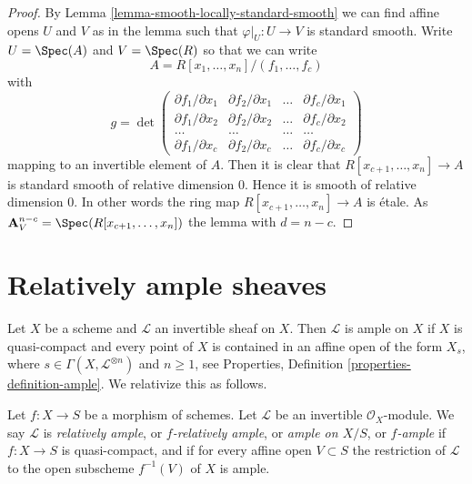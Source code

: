 \begin{proof}
By
Lemma \ref{lemma-smooth-locally-standard-smooth}
we can find affine opens $U$ and $V$ as in the lemma such that
$\varphi|_U : U \to V$ is standard smooth. Write
$U = \Spec(A)$ and $V = \Spec(R)$ so that we can write
$$
A = R[x_1, \ldots, x_n]/(f_1, \ldots, f_c)
$$
with
$$
g =
\det
\left(
\begin{matrix}
\partial f_1/\partial x_1 &
\partial f_2/\partial x_1 &
\ldots &
\partial f_c/\partial x_1 \\
\partial f_1/\partial x_2 &
\partial f_2/\partial x_2 &
\ldots &
\partial f_c/\partial x_2 \\
\ldots & \ldots & \ldots & \ldots \\
\partial f_1/\partial x_c &
\partial f_2/\partial x_c &
\ldots &
\partial f_c/\partial x_c
\end{matrix}
\right)
$$
mapping to an invertible element of $A$. Then it is clear that
$R[x_{c + 1}, \ldots, x_n] \to A$ is standard smooth of relative
dimension $0$. Hence it is smooth of relative dimension $0$.
In other words the ring map $R[x_{c + 1}, \ldots, x_n] \to A$
is \'etale. As $\mathbf{A}^{n - c}_V = \Spec(R[x_{c + 1}, \ldots, x_n])$
the lemma with $d = n - c$.
\end{proof}
















\section{Relatively ample sheaves}
\label{section-relatively-ample}

\noindent
Let $X$ be a scheme and $\mathcal{L}$ an invertible sheaf on $X$.
Then $\mathcal{L}$ is ample on $X$ if $X$ is quasi-compact and
every point of $X$ is contained in an affine open of the form
$X_s$, where $s \in \Gamma(X, \mathcal{L}^{\otimes n})$ and $n \geq 1$, see
Properties, Definition \ref{properties-definition-ample}.
We relativize this as follows.

\begin{definition}
\label{definition-relatively-ample}
Let $f : X \to S$ be a morphism of schemes.
Let $\mathcal{L}$ be an invertible $\mathcal{O}_X$-module.
We say $\mathcal{L}$ is {\it relatively ample}, or {\it $f$-relatively ample},
or {\it ample on $X/S$}, or {\it $f$-ample} if $f : X \to S$
is quasi-compact, and if for every affine open $V \subset S$
the restriction of $\mathcal{L}$ to the open subscheme
$f^{-1}(V)$ of $X$ is ample.
\end{definition}

